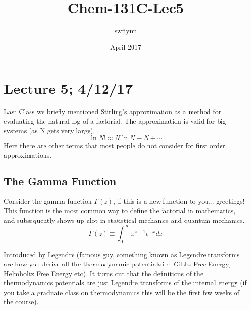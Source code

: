 \documentclass{article}
\title{Chem-131C-Lec5}
\author{swflynn }
\date{April 2017}
\begin{document}
\maketitle

\section*{Lecture 5; 4/12/17}
Last Class we briefly mentioned Stirling's approximation as a method for evaluating the natural log of a factorial. 
The approximation is valid for big systems (as N gets very large).
\begin{equation}
    \ln N! \approx N \ln N - N + \cdots
\end{equation}
Here there are other terms that most people do not consider for first order approximations. 

\subsection*{The Gamma Function}
Consider the gamma function $\Gamma(z)$, if this is a new function to you... greetings! 
This function is the most common way to define the factorial in mathematics, and subsequently shows up alot in statistical mechanics and quantum mechanics.
\begin{equation}
    \Gamma(z) \equiv \int_0^\infty x^{z-1}e^{-x}dx
\end{equation}

Introduced by Legendre (famous guy, something known as Legendre transforms are how you derive all the thermodynamic potentials i.e.  Gibbs Free Energy, Helmholtz Free Energy etc).
It turns out that the definitions of the thermodynamics potentials are just Legendre transforms of the internal energy (if you take a graduate class on thermodynamics this will be the first few weeks of the course). 
\end{document}
